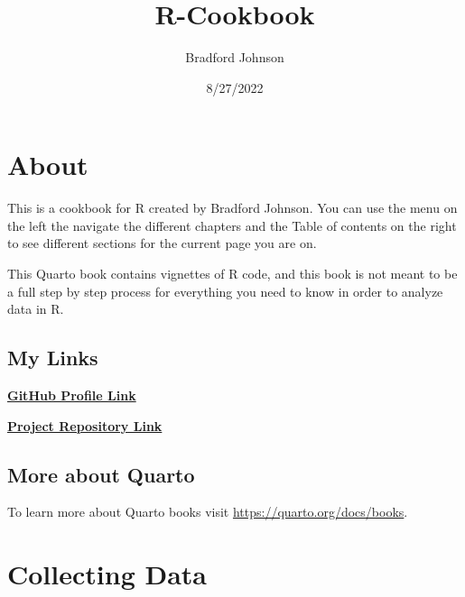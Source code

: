 \documentclass[
  letterpaper,
  DIV=11,
  numbers=noendperiod]{scrreprt}
\title{R-Cookbook}
\author{Bradford Johnson}
\date{8/27/2022}
\renewcommand*\contentsname{Table of contents}
\newcommand\contentsname{Table of contents}
\begin{document}
\maketitle
\ifdefined\Shaded\renewenvironment{Shaded}{\begin{tcolorbox}[frame hidden, boxrule=0pt, interior hidden, sharp corners, enhanced, borderline west={3pt}{0pt}{shadecolor}, breakable]}{\end{tcolorbox}}\fi

\renewcommand*\contentsname{Table of contents}
{
\hypersetup{linkcolor=}
\setcounter{tocdepth}{2}
\tableofcontents
}

\hypertarget{about}{%
\chapter*{About}\label{about}}

This is a cookbook for R created by Bradford Johnson. You can use the
menu on the left the navigate the different chapters and the Table of
contents on the right to see different sections for the current page you
are on.

This Quarto book contains vignettes of R code, and this book is not
meant to be a full step by step process for everything you need to know
in order to analyze data in R.

\hypertarget{my-links}{%
\section*{My Links}\label{my-links}}

\href{https://github.com/bradfordjohnson}{\textbf{GitHub Profile Link}}

\href{https://github.com/bradfordjohnson/r-cookbook}{\textbf{Project
Repository Link}}

\hypertarget{more-about-quarto}{%
\section*{More about Quarto}\label{more-about-quarto}}

To learn more about Quarto books visit
\url{https://quarto.org/docs/books}.


\hypertarget{collecting-data}{%
\chapter{\texorpdfstring{\textbf{Collecting
Data}}{Collecting Data}}\label{collecting-data}}
\end{document}
